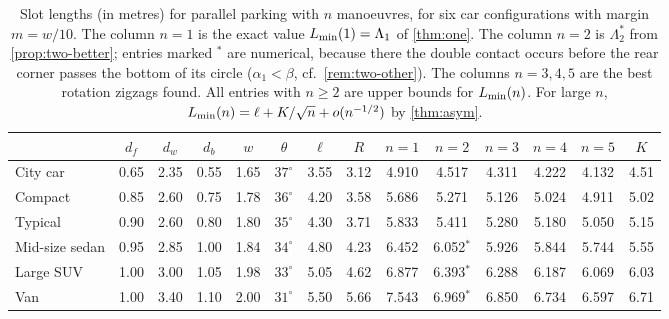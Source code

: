 \begin{table}[ht]
\centering\small
\setlength{\tabcolsep}{4pt}
\begin{tabular}{@{}l*{5}{c}cc*{5}{c}c@{}}
\toprule
& $d_f$ & $d_w$ & $d_b$ & $w$ & $\theta$ & $\ell$ & $R$ & $n=1$ & $n=2$ & $n=3$ & $n=4$ & $n=5$ & $K$\\
\midrule
City car & 0.65 & 2.35 & 0.55 & 1.65 & $37^\circ$ & 3.55 & 3.12 & 4.910 & 4.517 & 4.311 & 4.222 & 4.132 & 4.51\\
Compact & 0.85 & 2.60 & 0.75 & 1.78 & $36^\circ$ & 4.20 & 3.58 & 5.686 & 5.271 & 5.126 & 5.024 & 4.911 & 5.02\\
Typical & 0.90 & 2.60 & 0.80 & 1.80 & $35^\circ$ & 4.30 & 3.71 & 5.833 & 5.411 & 5.280 & 5.180 & 5.050 & 5.15\\
Mid-size sedan & 0.95 & 2.85 & 1.00 & 1.84 & $34^\circ$ & 4.80 & 4.23 & 6.452 & 6.052$^{*}$ & 5.926 & 5.844 & 5.744 & 5.55\\
Large SUV & 1.00 & 3.00 & 1.05 & 1.98 & $33^\circ$ & 5.05 & 4.62 & 6.877 & 6.393$^{*}$ & 6.288 & 6.187 & 6.069 & 6.03\\
Van & 1.00 & 3.40 & 1.10 & 2.00 & $31^\circ$ & 5.50 & 5.66 & 7.543 & 6.969$^{*}$ & 6.850 & 6.734 & 6.597 & 6.71\\
\bottomrule
\end{tabular}
\caption{Slot lengths (in metres) for parallel parking with $n$ manoeuvres, for six car configurations with margin $m=w/10$.
The column $n=1$ is the exact value $L_{\min}(1)=\Lambda_1$ of \cref{thm:one}.
The column $n=2$ is $\Lambda_2^*$ from \cref{prop:two-better}; entries marked $^*$ are numerical, because there the double contact occurs before the rear corner passes the bottom of its circle ($\alpha_1<\beta$, cf.\ \cref{rem:two-other}).
The columns $n=3,4,5$ are the best rotation zigzags found.
All entries with $n\ge2$ are upper bounds for $L_{\min}(n)$.
For large $n$, $L_{\min}(n)=\ell+K/\sqrt n+o(n^{-1/2})$ by \cref{thm:asym}.}
\label{tab:cars}
\end{table}
